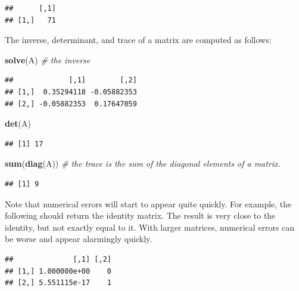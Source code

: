 \documentclass[]{book}
\newenvironment{Shaded}{\begin{snugshade}}{\end{snugshade}}
\newcommand{\CommentTok}[1]{\textcolor[rgb]{0.56,0.35,0.01}{\textit{#1}}}
\newcommand{\KeywordTok}[1]{\textcolor[rgb]{0.13,0.29,0.53}{\textbf{#1}}}
\newcommand{\NormalTok}[1]{#1}
\newcommand{\OperatorTok}[1]{\textcolor[rgb]{0.81,0.36,0.00}{\textbf{#1}}}
\theoremstyle{definition}
\theoremstyle{definition}
\theoremstyle{definition}
\theoremstyle{remark}
\begin{document}
\begin{verbatim}
##      [,1]
## [1,]   71
\end{verbatim}

The inverse, determinant, and trace of a matrix are computed as follows:

\begin{Shaded}
\begin{Highlighting}[]
\KeywordTok{solve}\NormalTok{(A) }\CommentTok{# the inverse}
\end{Highlighting}
\end{Shaded}

\begin{verbatim}
##             [,1]        [,2]
## [1,]  0.35294118 -0.05882353
## [2,] -0.05882353  0.17647059
\end{verbatim}

\begin{Shaded}
\begin{Highlighting}[]
\KeywordTok{det}\NormalTok{(A)}
\end{Highlighting}
\end{Shaded}

\begin{verbatim}
## [1] 17
\end{verbatim}

\begin{Shaded}
\begin{Highlighting}[]
\KeywordTok{sum}\NormalTok{(}\KeywordTok{diag}\NormalTok{(A)) }\CommentTok{# the trace is the sum of the diagonal elements of a matrix.}
\end{Highlighting}
\end{Shaded}

\begin{verbatim}
## [1] 9
\end{verbatim}

Note that numerical errors will start to appear quite quickly. For example, the following should return the identity matrix. The result is very close to the identity, but not exactly equal to it. With larger matrices, numerical errors can be worse and appear alarmingly quickly.

\begin{Shaded}
\end{Shaded}

\begin{verbatim}
##              [,1] [,2]
## [1,] 1.000000e+00    0
## [2,] 5.551115e-17    1
\end{verbatim}
\end{document}
